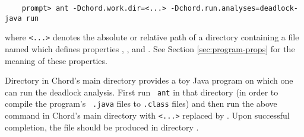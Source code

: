 \begin{verbatim}
    prompt> ant -Dchord.work.dir=<...> -Dchord.run.analyses=deadlock-java run
\end{verbatim}

where {\tt <...>} denotes the absolute or relative path of a directory
containing a file named  which defines
properties , , and
.  See Section \ref{sec:program-props} for the
meaning of these properties.

Directory  in Chord's main directory provides a toy Java
program on which one can run the deadlock analysis.  First run {\tt
  ant} in that directory (in order to compile the program's {\tt
  .java} files to {\tt .class} files) and then run the above command
in Chord's main directory with {\tt <...>} replaced by
.  Upon successful completion, the
file  should be produced in directory
.

